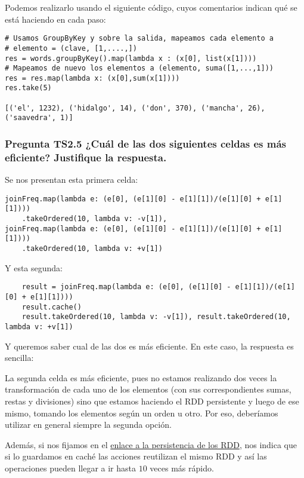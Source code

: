 \documentclass[11pt]{article}
\begin{document}
Podemos realizarlo usando el siguiente código, cuyos comentarios indican qué se está haciendo en cada paso:

\begin{verbatim}
# Usamos GroupByKey y sobre la salida, mapeamos cada elemento a
# elemento = (clave, [1,....,])
res = words.groupByKey().map(lambda x : (x[0], list(x[1])))
# Mapeamos de nuevo los elementos a (elemento, suma([1,...,1]))
res = res.map(lambda x: (x[0],sum(x[1])))
res.take(5)

[('el', 1232), ('hidalgo', 14), ('don', 370), ('mancha', 26), ('saavedra', 1)]
\end{verbatim}


\subsubsection*{Pregunta TS2.5 ¿Cuál de las dos siguientes celdas es más eficiente? Justifique la respuesta.}

Se nos presentan esta primera celda: 

\begin{verbatim}
joinFreq.map(lambda e: (e[0], (e[1][0] - e[1][1])/(e[1][0] + e[1][1])))
    .takeOrdered(10, lambda v: -v[1]),
joinFreq.map(lambda e: (e[0], (e[1][0] - e[1][1])/(e[1][0] + e[1][1])))
    .takeOrdered(10, lambda v: +v[1])
\end{verbatim}

Y esta segunda:

\begin{verbatim}
	result = joinFreq.map(lambda e: (e[0], (e[1][0] - e[1][1])/(e[1][0] + e[1][1])))
	result.cache()
	result.takeOrdered(10, lambda v: -v[1]), result.takeOrdered(10, lambda v: +v[1])
\end{verbatim}

Y queremos saber cual de las dos es más eficiente. En este caso, la respuesta es sencilla: 

La segunda celda es más eficiente, pues no estamos realizando dos veces la transformación de cada uno de los elementos (con sus correspondientes sumas, restas y divisiones) sino que estamos haciendo el RDD persistente y luego de ese mismo, tomando los elementos según un orden u otro. Por eso, deberíamos utilizar en general siempre la segunda opción.

Además, si nos fijamos en el \href{https://spark.apache.org/docs/2.2.0/rdd-programming-guide.html#rdd-persistence}{enlace a la persistencia de los RDD}, nos indica que si lo guardamos en caché las acciones reutilizan el mismo RDD y así las operaciones pueden llegar a ir hasta $10$ veces más rápido.
\end{document}
